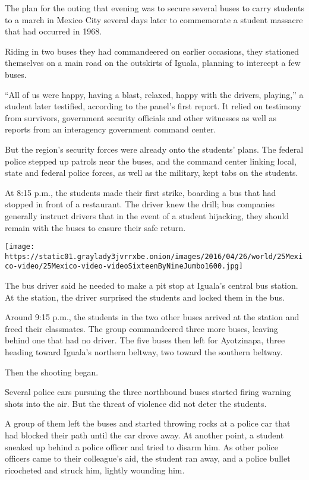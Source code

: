 The plan for the outing that evening was to secure several buses to
carry students to a march in Mexico City several days later to
commemorate a student massacre that had occurred in 1968.

Riding in two buses they had commandeered on earlier occasions, they
stationed themselves on a main road on the outskirts of Iguala, planning
to intercept a few buses.

``All of us were happy, having a blast, relaxed, happy with the drivers,
playing,'' a student later testified, according to the panel's first
report. It relied on testimony from survivors, government security
officials and other witnesses as well as reports from an interagency
government command center.

But the region's security forces were already onto the students' plans.
The federal police stepped up patrols near the buses, and the command
center linking local, state and federal police forces, as well as the
military, kept tabs on the students.

At 8:15 p.m., the students made their first strike, boarding a bus that
had stopped in front of a restaurant. The driver knew the drill; bus
companies generally instruct drivers that in the event of a student
hijacking, they should remain with the buses to ensure their safe
return.

\texttt{[image: https://static01.graylady3jvrrxbe.onion/images/2016/04/26/world/25Mexico-video/25Mexico-video-videoSixteenByNineJumbo1600.jpg]}

The bus driver said he needed to make a pit stop at Iguala's central bus
station. At the station, the driver surprised the students and locked
them in the bus.

Around 9:15 p.m., the students in the two other buses arrived at the
station and freed their classmates. The group commandeered three more
buses, leaving behind one that had no driver. The five buses then left
for Ayotzinapa, three heading toward Iguala's northern beltway, two
toward the southern beltway.

Then the shooting began.

Several police cars pursuing the three northbound buses started firing
warning shots into the air. But the threat of violence did not deter the
students.

A group of them left the buses and started throwing rocks at a police
car that had blocked their path until the car drove away. At another
point, a student sneaked up behind a police officer and tried to disarm
him. As other police officers came to their colleague's aid, the student
ran away, and a police bullet ricocheted and struck him, lightly
wounding him.

